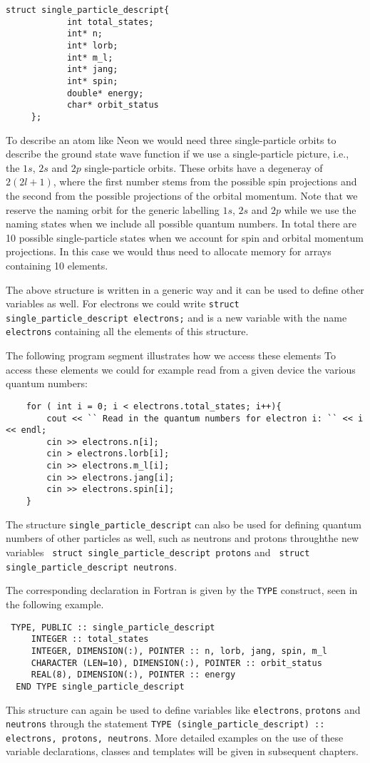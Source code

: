 \begin{lstlisting}
struct single_particle_descript{
            int total_states;
            int* n;
            int* lorb;
            int* m_l;
            int* jang;
            int* spin;
            double* energy;
            char* orbit_status
     };
\end{lstlisting}
To describe an atom like Neon we would need three 
single-particle orbits to describe the ground state wave function if we use
a single-particle picture, i.e., the $1s$, $2s$ and $2p$ 
single-particle orbits. These orbits have a degeneray of $2(2l+1)$,
where the first number stems from the possible spin projections and the second
from the possible projections of the orbital momentum.  Note that we reserve the naming orbit  for the generic labelling $1s$, $2s$ and $2p$ while we use the naming states when we include all possible quantum numbers. 
In total there are 10 possible single-particle states when we account for
spin and orbital momentum projections. In this case we would thus need
to allocate memory for arrays containing 10 elements.

The above structure is written in a generic way and it can be used to define
other variables as well. For electrons we could write 
\verb?struct single_particle_descript electrons;?
and is a new variable with the name \verb?electrons? containing all the elements
of this structure. 

The following program segment illustrates how we access these elements
To access these elements we could for example read from a given device the various
quantum numbers:
\begin{lstlisting}
    for ( int i = 0; i < electrons.total_states; i++){
        cout << `` Read in the quantum numbers for electron i: `` << i << endl;
        cin >> electrons.n[i];
        cin > electrons.lorb[i];
        cin >> electrons.m_l[i];
        cin >> electrons.jang[i];
        cin >> electrons.spin[i];
    } 
\end{lstlisting}
The structure {\tt single\_particle\_descript} can also be used for defining 
quantum numbers of other particles as well, such as neutrons and protons throughthe new variables
\verb? struct single_particle_descript protons? and 
\verb? struct single_particle_descript neutrons?. 


The corresponding declaration in Fortran is given by the \verb$TYPE$ construct, seen in the
following example.
\lstset{language=[90]Fortran}
\begin{lstlisting}
 TYPE, PUBLIC :: single_particle_descript
     INTEGER :: total_states
     INTEGER, DIMENSION(:), POINTER :: n, lorb, jang, spin, m_l
     CHARACTER (LEN=10), DIMENSION(:), POINTER :: orbit_status
     REAL(8), DIMENSION(:), POINTER :: energy
  END TYPE single_particle_descript
\end{lstlisting}
This structure can again be used to define variables like {\tt electrons},
{\tt protons} and {\tt neutrons}  through the statement 
\verb?TYPE (single_particle_descript) :: electrons, protons, neutrons?.
More detailed examples on the use of these variable declarations, classes and templates will be given 
in subsequent chapters.


